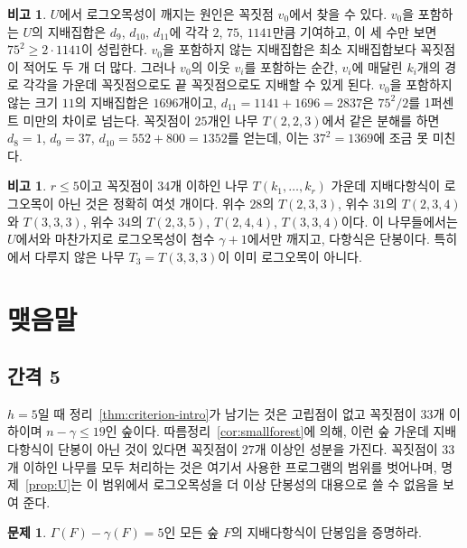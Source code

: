 \documentclass[11pt,a4paper]{article}
\theoremstyle{definition}
\newtheorem{remark}[theorem]{비고}
\newtheorem{problem}[theorem]{문제}
\newcommand{\MinNonLC}{27}
\begin{document}
\begin{remark}\label{rem:mechanism}
$U$에서 로그오목성이 깨지는 원인은 꼭짓점 $v_0$에서 찾을 수 있다. $v_0$을 포함하는
$U$의 지배집합은 $d_9$, $d_{10}$, $d_{11}$에 각각 $2$, $75$, $1141$만큼 기여하고, 이
세 수만 보면 $75^2\ge2\cdot1141$이 성립한다. $v_0$을 포함하지 않는 지배집합은 최소
지배집합보다 꼭짓점이 적어도 두 개 더 많다. 그러나 $v_0$의 이웃 $v_i$를 포함하는
순간, $v_i$에 매달린 $k_i$개의 경로 각각을 가운데 꼭짓점으로도 끝 꼭짓점으로도 지배할
수 있게 된다. $v_0$을 포함하지 않는 크기 $11$의 지배집합은 $1696$개이고,
$d_{11}=1141+1696=2837$은 $75^2/2$를 1퍼센트 미만의 차이로 넘는다. 꼭짓점이 $25$개인
나무 $T(2,2,3)$에서 같은 분해를 하면 $d_8=1$, $d_9=37$, $d_{10}=552+800=1352$를 얻는데,
이는 $37^2=1369$에 조금 못 미친다.
\end{remark}

\begin{remark}\label{rem:family}
$r\le5$이고 꼭짓점이 $34$개 이하인 나무 $T(k_1,\dots,k_r)$ 가운데 지배다항식이
로그오목이 아닌 것은 정확히 여섯 개이다. 위수 $28$의 $T(2,3,3)$, 위수 $31$의
$T(2,3,4)$와 $T(3,3,3)$, 위수 $34$의 $T(2,3,5)$, $T(2,4,4)$, $T(3,3,4)$이다. 이
나무들에서는 $U$에서와 마찬가지로 로그오목성이 첨수 $\gamma+1$에서만 깨지고, 다항식은
단봉이다. 특히 \cite[Proposition~1]{BS}에서 다루지 않은 나무 $T_3=T(3,3,3)$이 이미
로그오목이 아니다.
\end{remark}

\section{맺음말}\label{sec:remarks}

\subsection*{간격 5}
$h=5$일 때 정리~\ref{thm:criterion-intro}가 남기는 것은 고립점이 없고 꼭짓점이
$33$개 이하이며 $n-\gamma\le19$인 숲이다. 따름정리~\ref{cor:smallforest}에 의해, 이런
숲 가운데 지배다항식이 단봉이 아닌 것이 있다면 꼭짓점이 $\MinNonLC$개 이상인 성분을
가진다. 꼭짓점이 $33$개 이하인 나무를 모두 처리하는 것은 여기서 사용한 프로그램의
범위를 벗어나며, 명제~\ref{prop:U}는 이 범위에서 로그오목성을 더 이상 단봉성의
대용으로 쓸 수 없음을 보여 준다.

\begin{problem}
$\Gamma(F)-\gamma(F)=5$인 모든 숲 $F$의 지배다항식이 단봉임을 증명하라.
\end{problem}
\end{document}
